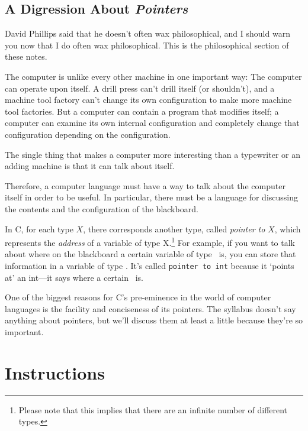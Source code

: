 \subsection{A Digression About {\em Pointers}}

    David Phillips said that he doesn't often wax philosophical, and I
should warn you now that I do often wax philosophical.  This is the
philosophical section of these notes.

    The computer is unlike every other machine in one important way: The
computer can operate upon itself.  A drill press can't drill itself (or
shouldn't), and a machine tool factory can't change its own
configuration to make more machine tool factories.  But a computer can
contain a program that modifies itself; a computer can examine its own
internal configuration and completely change that configuration
depending on the configuration.

    The single thing that makes a computer more interesting than a
typewriter or an adding machine is that it can talk about itself.

    Therefore, a computer language must have a way to talk about the
computer itself in order to be useful.  In particular, there must be a
language for discussing the contents and the configuration of the
blackboard.

    In C, for each type $X$, there corresponds another type, called {\em
pointer to } $X$, which represents the {\em address} of a variable of
type X.\footnote{Please note that this implies that there are an
infinite number of different types.} For example, if you want to talk
about where on the blackboard a certain variable of type \int\ is, you
can store that information in a variable of type \Int.  It's called
{\tt pointer to int} because it `points at' an int---it says where a
certain \int\ is.

    One of the biggest reasons for C's pre-eminence in the world of
computer languages is the facility and conciseness of its pointers.  The
syllabus doesn't say anything about pointers, but we'll discuss them at
least a little because they're so important.

\section{Instructions}

